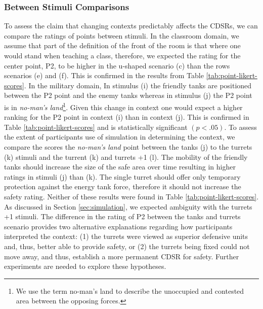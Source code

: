 \documentclass[11pt,letterpaper]{article}
\begin{document}
\subsubsection{Between Stimuli Comparisons}

To assess the claim that changing contexts predictably affects the CDSRs, we can compare the ratings of points between stimuli.  In the classroom domain, we assume that part of the definition of the front of the room is that where one would stand when teaching a class, therefore, we expected the rating for the center point, P2, to be higher in the u-shaped scenario (c) than the rows scenarios (e) and (f).  This is confirmed in the results from Table \ref{tab:point-likert-scores}.  In the military domain,  In stimulus (i) the friendly tanks are positioned between the P2 point and the enemy tanks whereas in stimulus (j) the P2 point is in \textit{no-man's land}\footnote{We use the term no-man's land to describe the unoccupied and contested area between the opposing forces.}.  Given this change in context one would expect a higher ranking for the P2 point in context (i) than in context (j). This is confirmed in Table \ref{tab:point-likert-scores} and is statistically significant $(p<.05)$.  To assess the extent of participants use of simulation in determining the context, we compare the scores the \textit{no-man's land} point between the tanks (j) to the turrets (k) stimuli and the turrent (k) and turrets +1 (l).  The mobility of the friendly tanks should increase the size of the safe area over time resulting in higher ratings in stimuli (j) than (k).  The single turret should offer only temporary protection against the energy tank force, therefore it should not increase the safety rating.  Neither of these results were found in Table \ref{tab:point-likert-scores}.  As discussed in Section \ref{sec:simulation}, we expected ambiguity with the turrets +1 stimuli.  The difference in the rating of P2 between the tanks and turrets scenario provides two alternative explanations regarding how participants interpreted the context:  (1) the turrets were viewed as superior defensive units and, thus, better able to provide safety, or (2) the turrets being fixed could not move away, and thus, establish a more permanent CDSR for safety.  Further experiments are needed to explore these hypotheses. 
\end{document}
